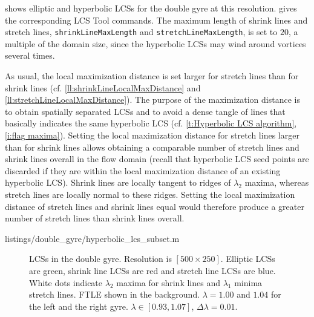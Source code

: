 \documentclass[5p]{elsarticle}
\newlength\figurewidth
\begin{document}
 shows elliptic and hyperbolic LCSs for the double gyre at this resolution.
 gives the corresponding LCS Tool commands. The maximum length of shrink lines and stretch lines, \lstinline!shrinkLineMaxLength! and \lstinline!stretchLineMaxLength!, is set to $20$, a multiple of the domain size, since the hyperbolic LCSs may wind around vortices several times.

As usual, the local maximization distance is set larger for stretch lines than for shrink lines (cf. \cref{ll:shrinkLineLocalMaxDistance} and \cref{ll:stretchLineLocalMaxDistance}). The purpose of the maximization distance is to obtain spatially separated LCSs and to avoid a dense tangle of lines that basically indicates the same hyperbolic LCS (cf. \cref{t:Hyperbolic LCS algorithm}, \cref{i:flag maxima}). Setting the local maximization distance for stretch lines larger than for shrink lines allows obtaining a comparable number of stretch lines and shrink lines overall in the flow domain (recall that hyperbolic LCS seed points are discarded if they are within the local maximization distance of an existing hyperbolic LCS). Shrink lines are locally tangent to ridges of $\lambda_2$ maxima, whereas stretch lines are locally normal to these ridges. Setting the local maximization distance of stretch lines and shrink lines equal would therefore produce a greater number of stretch lines than shrink lines overall.


        {listings/double_gyre/hyperbolic_lcs_subset.m}

\begin{figure}
\centering
\setlength{}


\caption{
LCSs in the double gyre.
Resolution is $[500\times250]$.
Elliptic LCSs are green, shrink line LCSs are red and stretch line LCSs are blue.
White dots indicate $\lambda_2$ maxima for shrink lines and $\lambda_1$ minima stretch lines.
FTLE shown in the background.
$\lambda = 1.00$ and $1.04$ for the left and the right gyre.
$\lambda \in [0.93,1.07]$, $\Delta\lambda = 0.01$.
}
\label{f:double gyre lambda hyperbolic LCS}
\end{figure}
\end{document}
